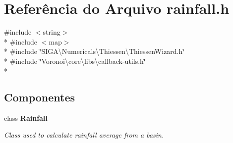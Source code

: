 \section{Referência do Arquivo rainfall.\+h}
\label{rainfall_8h}
{\ttfamily \#include $<$string$>$}\\*
{\ttfamily \#include $<$map$>$}\\*
{\ttfamily \#include \char`\"{}S\+I\+G\+A\textbackslash{}\+Numericals\textbackslash{}\+Thiessen\textbackslash{}\+Thiessen\+Wizard.\+h\char`\"{}}\\*
{\ttfamily \#include \char`\"{}Voronoi\textbackslash{}core\textbackslash{}libs\textbackslash{}callback-\/utils.\+h\char`\"{}}\\*
\subsection*{Componentes}
\begin{DoxyCompactItemize}
\item 
class {\bf Rainfall}
\begin{DoxyCompactList}\small\item\em Class used to calculate rainfall average from a basin. \end{DoxyCompactList}\end{DoxyCompactItemize}

